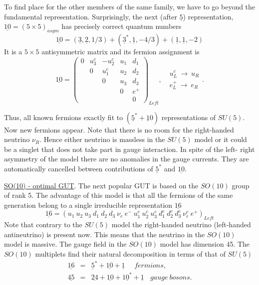 \documentclass{cernyrep}
\begin{document}
To find place for the other members of the same family, we have
 to go beyond the fundamental representation. Surprisingly, the
 next (after $\underline 5$) representation, $\underline {10} =
 ( 5 \times 5)_{asym} $ has precisely correct quantum numbers
$$\underline {10} = (\underline 3 , \underline 2 , 1/3) +
 (\underline 3^* , \underline 1 , -4/3) + (\underline 1 ,
 \underline 1 , -2) $$
It is a $5 \times 5$ antisymmetric matrix and its fermion
 assignment is
$$ \underline {10} = \left ( \begin{array}{ccccc}
0 & u_3^c & -u_2^c & u_1 & d_1 \\
  & 0 & u_1^c & u_2 & d_2 \\
  &  & 0 & u_3 & d_3 \\   &  &  & 0 & e^+ \\   &  &  &  &  0
\end{array} \right )_{Left} , \ \ \  \begin{array}{c}
u_L^c \ \rightarrow \ u_R \\  e_L^+ \ \rightarrow \ e_R
\end{array}. $$

Thus, all known fermions exactly fit to $(\underline 5^* + \underline
 10 ) $ representations of $SU(5)$. Now new fermions appear. Note
that there is no room for the right-handed neutrino $\nu_R$. Hence
either neutrino is massless in the $SU(5)$ model or it could be a singlet
that does not take part in gauge interaction. In spite of the left-
right asymmetry of the model there are no anomalies in the gauge
currents. They are automatically cancelled between contributions of $
\underline 5^* $ and $\underline {10} $.


\underline{SO(10) - optimal GUT}.  The next popular GUT is based on the $SO(10)$ group of rank 5.
The advantage of this model is that
 all the fermions of the same generation belong to a single
irreducible representation $\underline {16}$
$$\underline {16} = (u_1 \ u_2 \ u_3 \ d_1 \ d_2 \ d_3 \ \nu_e \ e^- \
 u_1^c \ u_2^c \ u_3^c \ d_1^c \ d_2^c \ d_3^c \ \nu_e^c \ e^+ )_{Left}$$
Note that contrary to the $SU(5)$ model the right-handed neutrino
(left-handed antineutrino) is present now. This means that the neutrino
in the $SO(10)$ model is massive. The gauge field in the $SO(10)$ model has dimension 45.
The $SO(10)$ multiplets find their
natural decomposition in terms of that of $SU(5)$
\begin{eqnarray*}
\underline {16} & = & \underline 5^* + \underline {10} + \underline
 1  \ \ \ \ \ \ fermions , \\
\underline {45} & = & \underline {24} + \underline {10} + \underline
 {10^*} + \underline 1 \ \ \ \ gauge \ bosons . \end{eqnarray*}
 
\end{document}
